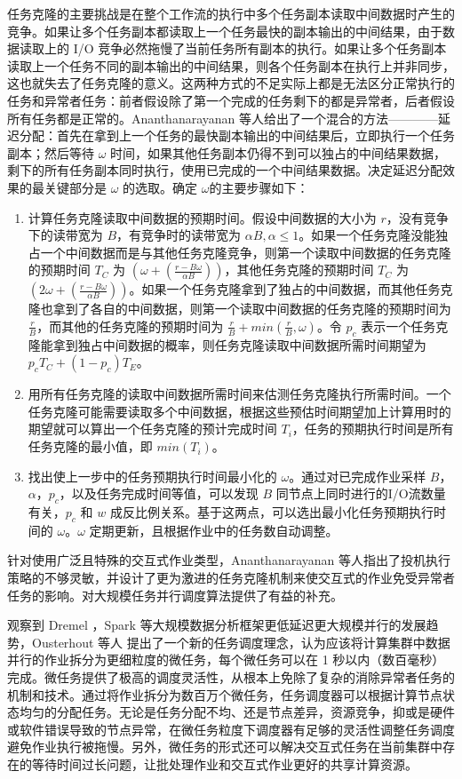 任务克隆的主要挑战是在整个工作流的执行中多个任务副本读取中间数据时产生的竞争。如果让多个任务副本都读取上一个任务最快的副本输出的中间结果，由于数据读取上的 I/O 竞争必然拖慢了当前任务所有副本的执行。如果让多个任务副本读取上一个任务不同的副本输出的中间结果，则各个任务副本在执行上并非同步，这也就失去了任务克隆的意义。这两种方式的不足实际上都是无法区分正常执行的任务和异常者任务：前者假设除了第一个完成的任务剩下的都是异常者，后者假设所有任务都是正常的。Ananthanarayanan 等人给出了一个混合的方法————延迟分配：首先在拿到上一个任务的最快副本输出的中间结果后，立即执行一个任务副本；然后等待 $\omega$ 时间，如果其他任务副本仍得不到可以独占的中间结果数据，剩下的所有任务副本同时执行，使用已完成的一个中间结果数据。决定延迟分配效果的最关键部分是 $\omega$ 的选取。确定 $\omega$的主要步骤如下：
\begin{enumerate}
\item 计算任务克隆读取中间数据的预期时间。假设中间数据的大小为 $r$，没有竞争下的读带宽为 $B$，有竞争时的读带宽为 $\alpha B, \alpha \leq 1$。如果一个任务克隆没能独占一个中间数据而是与其他任务克隆竞争，则第一个读取中间数据的任务克隆的预期时间 $T_C$ 为 $(\omega + (\frac{r - B \omega}{\alpha B}))$，其他任务克隆的预期时间 $T_C$ 为 $(2 \omega + (\frac{r - B \omega}{\alpha B}))$。如果一个任务克隆拿到了独占的中间数据，而其他任务克隆也拿到了各自的中间数据，则第一个读取中间数据的任务克隆的预期时间为 $\frac{r}{B}$，而其他的任务克隆的预期时间为 $\frac{r}{B} + min(\frac{r}{B}, \omega)$。令 $p_c$ 表示一个任务克隆能拿到独占中间数据的概率，则任务克隆读取中间数据所需时间期望为 $p_c T_C + (1-p_c) T_E$。
\item 用所有任务克隆的读取中间数据所需时间来估测任务克隆执行所需时间。一个任务克隆可能需要读取多个中间数据，根据这些预估时间期望加上计算用时的期望就可以算出一个任务克隆的预计完成时间 $T_i$，任务的预期执行时间是所有任务克隆的最小值，即 $min(T_i)$。
\item 找出使上一步中的任务预期执行时间最小化的 $\omega$。通过对已完成作业采样 $B$，$\alpha$，$p_c$，以及任务完成时间等值，可以发现 $B$ 同节点上同时进行的I/O流数量有关，$p_c$ 和 $w$ 成反比例关系。基于这两点，可以选出最小化任务预期执行时间的 $\omega$。$\omega$ 定期更新，且根据作业中的任务数自动调整。
\end{enumerate}

针对使用广泛且特殊的交互式作业类型，Ananthanarayanan 等人指出了投机执行策略的不够灵敏，并设计了更为激进的任务克隆机制来使交互式的作业免受异常者任务的影响。对大规模任务并行调度算法提供了有益的补充。

观察到 Dremel \cite{36632}，Spark \cite{Zaharia:2010:SCC:1863103.1863113} 等大规模数据分析框架更低延迟更大规模并行的发展趋势，Ousterhout 等人 \cite{Ousterhout:2013:CTT:2490483.2490497} 提出了一个新的任务调度理念，认为应该将计算集群中数据并行的作业拆分为更细粒度的微任务，每个微任务可以在 1 秒以内（数百毫秒）完成。微任务提供了极高的调度灵活性，从根本上免除了复杂的消除异常者任务的机制和技术。通过将作业拆分为数百万个微任务，任务调度器可以根据计算节点状态均匀的分配任务。无论是任务分配不均、还是节点差异，资源竞争，抑或是硬件或软件错误导致的节点异常，在微任务粒度下调度器有足够的灵活性调整任务调度避免作业执行被拖慢。另外，微任务的形式还可以解决交互式任务在当前集群中存在的等待时间过长问题，让批处理作业和交互式作业更好的共享计算资源。


